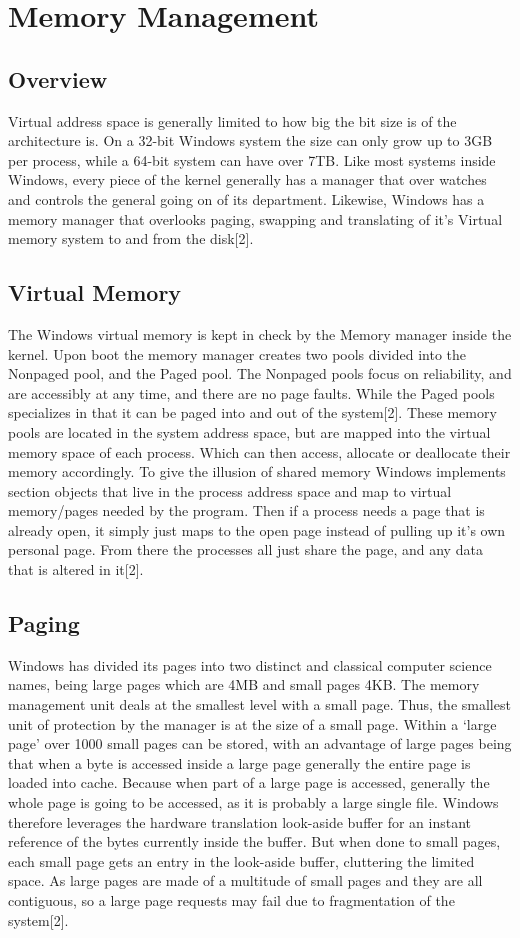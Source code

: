 \documentclass{article}
\begin{document}
\section{Memory Management}
\subsection{Overview}
	Virtual address space is generally limited to how big the bit size is of the architecture is. On a 32-bit Windows system the size can only grow up to 3GB per process, while a 64-bit system can have over 7TB. Like most systems inside Windows, every piece of the kernel generally has a manager that over watches and controls the general going on of its department. Likewise, Windows has a memory manager that overlooks paging, swapping and translating of it’s Virtual memory system to and from the disk[2].

\subsection{Virtual Memory}
    The Windows virtual memory is kept in check by the Memory manager inside the kernel. Upon boot the memory manager creates two pools divided into the Nonpaged pool, and the Paged pool. The Nonpaged pools focus on reliability, and are accessibly at any time, and there are no page faults. While the Paged pools specializes in that it can be paged into and out of the system[2]. These memory pools are located in the system address space, but are mapped into the virtual memory space of each process. Which can then access,  allocate or deallocate their memory accordingly. To give the illusion of shared memory Windows implements section objects that live in the process address space and map to virtual memory/pages needed by the program. Then if a process needs a page that is already open, it simply just maps to the open page instead of pulling up it’s own personal page. From there the processes all just share the page, and any data that is altered in it[2].

\subsection{Paging}
	Windows has divided its pages into two distinct and classical computer science names, being large pages which are 4MB and small pages 4KB. The memory management unit deals at the smallest level with a small page. Thus, the smallest unit of protection by the manager is at the size of a small page. Within a ‘large page’ over 1000 small pages can be stored, with an advantage of large pages being that when a byte is accessed inside a large page generally the entire page is loaded into cache. Because when part of a large page is accessed, generally the whole page is going to be accessed, as it is probably a large single file. Windows therefore leverages the hardware translation look-aside buffer for an instant reference of the bytes currently inside the buffer. But when done to small pages, each small page gets an entry in the look-aside buffer, cluttering the limited space. As large pages are made of a multitude of small pages and they are all contiguous, so a large page requests may fail due to fragmentation of the system[2].
\end{document}

